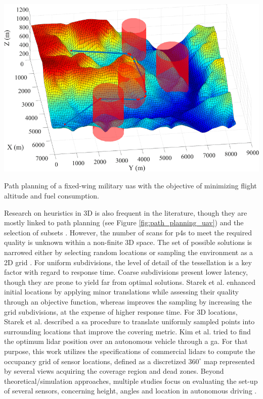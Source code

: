 \begin{marginfigure}[-6.0cm]
	\includegraphics{figs/context/uav_path_planning.png}
	\caption{Path planning of a fixed-wing military \acrshort{uas} with the objective of minimizing flight altitude and fuel consumption.}
	\label{fig:path_planning_uav}
\end{marginfigure}
Research on heuristics in 3D is also frequent in the literature, though they are mostly linked to path planning \cite{pehlivanoglu_enhanced_2021, roberge_parallel_2021} (see Figure \ref{fig:path_planning_uav}) and the selection of subsets \cite{pehlivanoglu_enhanced_2021}. However, the number of scans for \acrshort{p4s} to meet the required quality is unknown within a non-finite 3D space. The set of possible solutions is narrowed either by selecting random locations \cite{chen_indoor_2018} or sampling the environment as a 2D grid \cite{starek_viewshed_2020, giorgini_sensor-based_2019, jia_comparison_2017}. For uniform subdivisions, the level of detail of the tessellation is a key factor with regard to response time. Coarse subdivisions present lower latency, though they are prone to yield far from optimal solutions. Starek et al. \cite{starek_viewshed_2020} enhanced initial locations by applying minor translations while assessing their quality through an objective function, whereas \cite{soudarissanane_optimizing_2012} improves the sampling by increasing the grid subdivisions, at the expense of higher response time. For 3D locations, Starek et al. \cite{starek_viewshed_2020} described a \acrshort{sa} procedure to translate uniformly sampled points into surrounding locations that improve the covering metric. Kim et al. \cite{kim_placement_2020} tried to find the optimum \acrshort{lidar} position over an autonomous vehicle through a \acrshort{ga}. For that purpose, this work utilizes the specifications of commercial \acrshort{lidar}s to compute the occupancy grid of sensor locations, defined as a discretized $360^\circ$ map represented by several views acquiring the coverage region and dead zones. Beyond theoretical/simulation approaches, multiple studies focus on evaluating the set-up of several sensors, concerning height, angles and location in autonomous driving \cite{pereira_self_2016, veronese_accurate_2018}. 

